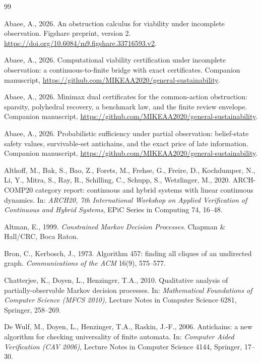 \begin{thebibliography}{99}\footnotesize

 Abaee, A., 2026. An obstruction calculus for viability under incomplete observation. Figshare preprint, version 2. \url{https://doi.org/10.6084/m9.figshare.33716593.v2}.

 Abaee, A., 2026. Computational viability certification under incomplete observation: a continuous-to-finite bridge with exact certificates. Companion manuscript, \url{https://github.com/MIKEAA2020/general-sustainability}.

 Abaee, A., 2026. Minimax dual certificates for the common-action obstruction: sparsity, polyhedral recovery, a benchmark law, and the finite review envelope. Companion manuscript, \url{https://github.com/MIKEAA2020/general-sustainability}.

 Abaee, A., 2026. Probabilistic sufficiency under partial observation: belief-state safety values, survivable-set antichains, and the exact price of late information. Companion manuscript, \url{https://github.com/MIKEAA2020/general-sustainability}.

 Althoff, M., Bak, S., Bao, Z., Forets, M., Frehse, G., Freire, D., Kochdumper, N., Li, Y., Mitra, S., Ray, R., Schilling, C., Schupp, S., Wetzlinger, M., 2020. ARCH-COMP20 category report: continuous and hybrid systems with linear continuous dynamics. In: \emph{ARCH20, 7th International Workshop on Applied Verification of Continuous and Hybrid Systems}, EPiC Series in Computing 74, 16--48.

 Altman, E., 1999. \emph{Constrained Markov Decision Processes}. Chapman \& Hall/CRC, Boca Raton.

 Bron, C., Kerbosch, J., 1973. Algorithm 457: finding all cliques of an undirected graph. \emph{Communications of the ACM} 16(9), 575--577.

 Chatterjee, K., Doyen, L., Henzinger, T.A., 2010. Qualitative analysis of partially-observable Markov decision processes. In: \emph{Mathematical Foundations of Computer Science (MFCS 2010)}, Lecture Notes in Computer Science 6281, Springer, 258--269.

 De Wulf, M., Doyen, L., Henzinger, T.A., Raskin, J.-F., 2006. Antichains: a new algorithm for checking universality of finite automata. In: \emph{Computer Aided Verification (CAV 2006)}, Lecture Notes in Computer Science 4144, Springer, 17--30.


\end{thebibliography}
